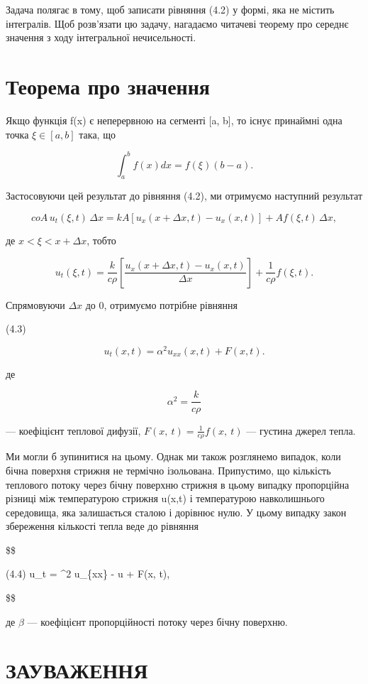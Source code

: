 \documentclass[
  ukrainian,
]{article}
\begin{document}
Задача полягає в тому, щоб записати рівняння (4.2) у формі, яка не
містить інтегралів. Щоб розв'язати цю задачу, нагадаємо читачеві теорему
про середнє значення з ходу інтегральної нечисельності.

\section{Теорема про
значення}\label{ux442ux435ux43eux440ux435ux43cux430-ux43fux440ux43e-ux437ux43dux430ux447ux435ux43dux43dux44f}

Якщо функція f(x) є неперервною на сегменті {[}a, b{]}, то існує
принаймні одна точка \(\xi \in [a, b]\) така, що

\[\int_{a}^{b} f(x) dx = f(\xi) (b-a).\]

Застосовуючи цей результат до рівняння (4.2), ми отримуємо наступний
результат

\[
coA\,u_t(\xi, t)\,\Delta x = kA\left[u_x(x + \Delta x, t) - u_x(x, t)\right] + Af(\xi, t)\,\Delta x,
\]

де \(x < \xi < x + \Delta x\), тобто

\[
u_t(\xi, t) = \frac{k}{c\rho}\left[\frac{u_x(x + \Delta x, t) - u_x(x, t)}{\Delta x}\right] + \frac{1}{c\rho} f(\xi, t).
\]

Спрямовуючи \(\Delta x\) до 0, отримуємо потрібне рівняння

(4.3)

\[u_t(x, t) = \alpha^2 u_{xx}(x, t) + F(x, t).\]

де

\[\alpha^{2}=\frac{k}{c\rho}\]

--- коефіцієнт теплової дифузії,
\(F\left(x,\ t\right)=\frac{1}{c\rho}f\left(x,\ t\right)\) --- густина
джерел тепла.

Ми могли б зупинитися на цьому. Однак ми також розглянемо випадок, коли
бічна поверхня стрижня не термічно ізольована. Припустимо, що кількість
теплового потоку через бічну поверхню стрижня в цьому випадку
пропорційна різниці між температурою стрижня u(x,t) і температурою
навколишнього середовища, яка залишається сталою і дорівнює нулю. У
цьому випадку закон збереження кількості тепла веде до рівняння

\$\$

(4.4) u\_t = \alpha\^{}2 u\_\{xx\} - \beta u + F(x, t),

\$\$

де \(\beta\) --- коефіцієнт пропорційності потоку через бічну поверхню.

\section{ЗАУВАЖЕННЯ}\label{ux437ux430ux443ux432ux430ux436ux435ux43dux43dux44f-3}
\end{document}

